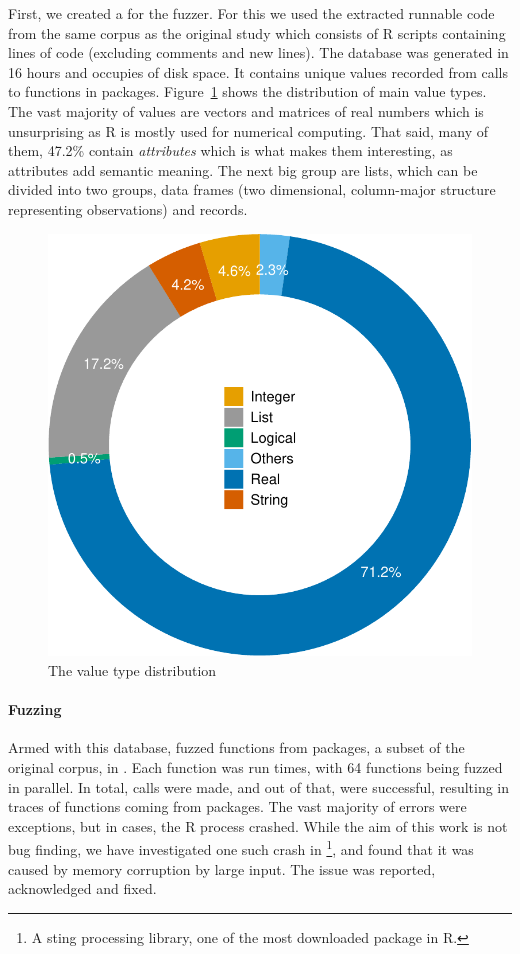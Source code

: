 \documentclass[sigplan,nonacm,anonymous,review]{acmart}
\begin{document}
First, we created a \sxpdb for the fuzzer.
For this we used the extracted runnable code from the same corpus as the original study which consists of \DBNumSourceFiles R scripts containing \DBSourceLinesOfCodeRnd lines of code (excluding comments and new lines).
The database was generated in 16 hours and occupies \DBFileSize of disk space.
It contains \DBValuesRnd unique values recorded from \DBNumCallsRnd calls to \DBNumFunctionsRnd functions in \DBNumPackages packages.
Figure~\ref{fig:argsdb-value-distribution} shows the distribution of main value types.
The vast majority of values are vectors and matrices of real numbers which is unsurprising as R is mostly used for numerical computing.
That said, many of them, 47.2\%  contain \textit{attributes} which is what makes them interesting, as attributes add semantic meaning.
The next big group are lists, which can be divided into two groups, data frames (two dimensional, column-major structure representing observations) and records.

\begin{figure}
    \centering
    \includegraphics[width=.6\columnwidth]{code-and-figures/argsdb-value-distribution.pdf}
    \vspace{-3mm}
    \caption{The \sxpdb value type distribution}
    \label{fig:argsdb-value-distribution}
\end{figure}

\paragraph{Fuzzing}

Armed with this database, \tool fuzzed \UFNumFunctions functions from \UFNumPackages packages, a subset of the original corpus, in \UFTracingTime.
Each function was run \UFTracingBudget times, with 64 functions being fuzzed in parallel.
In total, \UFNumTracesRnd calls were made, and out of that, \UFRatioSucesssTraces were successful, resulting in \UFNumSuccessTraces traces of \UFNumSuccessFunctions functions coming from \UFNumSuccessPackages packages.
The vast majority of errors were exceptions, but in \UFNumCrashedRSessions cases, the R process crashed.
While the aim of this work is not bug finding, we have investigated one such crash in \footnote{A sting processing library, one of the most downloaded package in R.}, and found that it was caused by memory corruption by large input.
The issue was reported, acknowledged and fixed.
\end{document}
